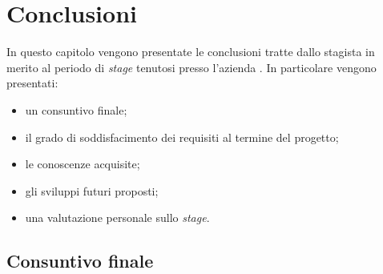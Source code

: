 
\chapter{Conclusioni}
\label{cap:conclusioni}
In questo capitolo vengono presentate le conclusioni tratte dallo stagista in merito al periodo di \textit{stage} tenutosi presso l'azienda \visione{}. In particolare vengono presentati:
\begin{itemize}
	\item un consuntivo finale;
	\item il grado di soddisfacimento dei requisiti al termine del progetto;
	\item le conoscenze acquisite;
	\item gli sviluppi futuri proposti;
	\item una valutazione personale sullo \textit{stage}.
\end{itemize}
\section{Consuntivo finale}

